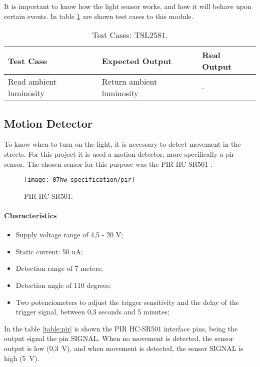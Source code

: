 It is important to know how the light sensor works, and how it will behave upon certain events. In table \ref{table:test_light_sen} are shown test cases to this module.

\begin{table}[H]
	\centering
	\resizebox{\columnwidth}{!}
	{
		\begin{tabular}{|m{3cm}|m{5cm}||m{5cm}|}
			\hline
			\textbf{Test Case} & \textbf{Expected Output} & \textbf{Real Output}
			\\\hline\hline
			Read ambient luminosity & Return ambient luminosity  & -
			\\\hline
		\end{tabular}
	}
	\caption{Test Cases: TSL2581.}
	\label{table:test_light_sen}
\end{table}

\clearpage
\subsection{Motion Detector}
To know when to turn on the light, it is necessary to detect movement in the streets. For this project it is used a motion detector, more specifically a \ac{pir} sensor. The chosen sensor for this purpose was the PIR HC-SR501 \cite{pir}.

\begin{figure}[H]
	\centering
	\texttt{[image: 07hw\_specification/pir]}
	\caption{PIR HC-SR501.}
	\label{fig:pir}
\end{figure}

\paragraph*{Characteristics}
\begin{itemize}
	\item Supply voltage range of 4,5 - 20 V;
	\item Static current: 50 uA;
	\item Detection range of 7 meters;
	\item Detection angle of 110 degrees;
	\item Two potenciometers to adjust the trigger sensitivity and the delay of the trigger signal, between 0,3 seconds and 5 minutes;
\end{itemize}

In the table \ref{table:pir} is shown the PIR HC-SR501 interface pins, being the output signal the pin SIGNAL. When no movement is detected, the sensor output is low (0,3~V), and when movement is detected, the sensor SIGNAL is high (5~V). 

